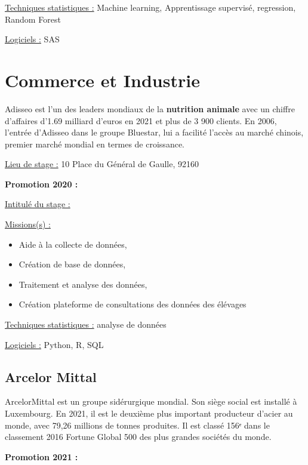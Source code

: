 \documentclass[
  letterpaper,
  DIV=11,
  numbers=noendperiod]{scrreprt}
\begin{document}
\uline{Techniques statistiques :} Machine learning, Apprentissage
supervisé, regression, Random Forest

\uline{Logiciels :} SAS


\hypertarget{commerce-et-industrie}{%
\chapter{Commerce et Industrie}\label{commerce-et-industrie}}

Adisseo est l'un des leaders mondiaux de la \textbf{nutrition animale}
avec un chiffre d'affaires d'1.69 milliard d'euros en 2021 et plus de 3
900 clients. En 2006, l'entrée d'Adisseo dans le groupe Bluestar, lui a
facilité l'accès au marché chinois, premier marché mondial en termes de
croissance.

\uline{Lieu de stage :} 10 Place du Général de Gaulle, 92160

\textbf{Promotion 2020 :}

\uline{Intitulé du stage :}

\uline{Missions(s) :}

\begin{itemize}
\item
  Aide à la collecte de données,
\item
  Création de base de données,
\item
  Traitement et analyse des données,
\item
  Création plateforme de consultations des données des élévages
\end{itemize}

\uline{Techniques statistiques :} analyse de données

\uline{Logiciels :} Python, R, SQL

\hypertarget{arcelor-mittal}{%
\section{\texorpdfstring{\textbf{Arcelor
Mittal}}{Arcelor Mittal}}\label{arcelor-mittal}}

ArcelorMittal est un groupe sidérurgique mondial. Son siège social est
installé à Luxembourg. En 2021, il est le deuxième plus important
producteur d'acier au monde, avec 79,26 millions de tonnes produites. Il
est classé 156ᵉ dans le classement 2016 Fortune Global 500 des plus
grandes sociétés du monde.

\textbf{Promotion 2021 :}
\end{document}
